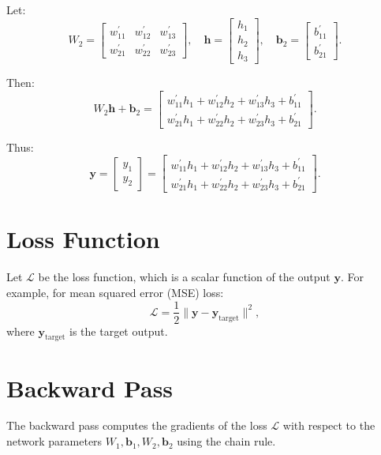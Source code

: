 \begin{notechapter}
Let:
\[
W_2 = \begin{bmatrix}
w_{11}^{\prime} & w_{12}^{\prime} & w_{13}^{\prime} \\
w_{21}^{\prime} & w_{22}^{\prime} & w_{23}^{\prime}
\end{bmatrix}, \quad
\mathbf{h} = \begin{bmatrix}
h_1 \\
h_2 \\
h_3
\end{bmatrix}, \quad
\mathbf{b}_2 = \begin{bmatrix}
b_{11}^{\prime} \\
b_{21}^{\prime}
\end{bmatrix}.
\]

Then:
\[
W_2 \mathbf{h} + \mathbf{b}_2 = \begin{bmatrix}
w_{11}^{\prime}h_1 + w_{12}^{\prime}h_2 + w_{13}^{\prime}h_3 + b_{11}^{\prime} \\
w_{21}^{\prime}h_1 + w_{22}^{\prime}h_2 + w_{23}^{\prime}h_3 + b_{21}^{\prime}
\end{bmatrix}.
\]

Thus:
\[
\mathbf{y} = \begin{bmatrix}
y_1 \\
y_2
\end{bmatrix} = \begin{bmatrix}
w_{11}^{\prime}h_1 + w_{12}^{\prime}h_2 + w_{13}^{\prime}h_3 + b_{11}^{\prime} \\
w_{21}^{\prime}h_1 + w_{22}^{\prime}h_2 + w_{23}^{\prime}h_3 + b_{21}^{\prime}
\end{bmatrix}.
\]

\section{Loss Function}

Let \( \mathcal{L} \) be the loss function, which is a scalar 
function of the output \( \mathbf{y} \). For example, for mean 
squared error (MSE) loss:
\[
\mathcal{L} = \frac{1}{2} \|\mathbf{y} - \mathbf{y}_{\text{target}}\|^2,
\]
where \( \mathbf{y}_{\text{target}} \) is the target output.

\section{Backward Pass}

The backward pass computes the gradients of the loss \( \mathcal{L} \) 
with respect to the network parameters \( W_1, \mathbf{b}_1, W_2, \mathbf{b}_2 \) 
using the chain rule.


\end{notechapter}
